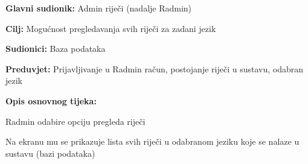 \noindent {}
\begin{packed_item}

	\item \textbf{Glavni sudionik: } Admin riječi (nadalje Radmin)
	\item \textbf{Cilj: } Mogućnost pregledavanja svih riječi za zadani jezik
	\item \textbf{Sudionici: } Baza podataka
	\item \textbf{Preduvjet: } Prijavljivanje u Radmin račun, postojanje riječi u sustavu, odabran jezik
	\item  \textbf{Opis osnovnog tijeka:}
	
	\item[] \begin{packed_enum}
		
		\item Radmin odabire opciju pregleda riječi
		\item Na ekranu mu se prikazuje lista svih riječi u odabranom jeziku koje se nalaze u sustavu (bazi podataka)

	\end{packed_enum}
	
\end{packed_item}

